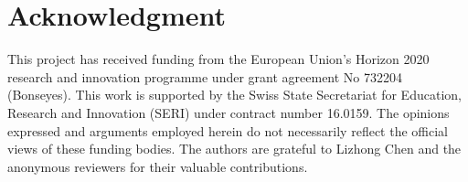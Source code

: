 \documentclass[conference]{IEEEtran}
\begin{document}
\section*{Acknowledgment}

This project has received funding from the European Union's Horizon 2020 research and innovation programme under grant agreement No 732204 (Bonseyes). This work is supported by the Swiss State Secretariat for Education, Research and Innovation (SERI) under contract number 16.0159. The opinions expressed and arguments employed herein do not necessarily reflect the official views of these funding bodies. The authors are grateful to Lizhong Chen and the anonymous reviewers for their valuable contributions.





\end{document}

